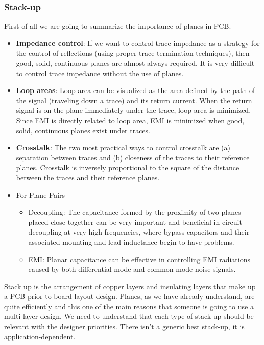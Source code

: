 \documentclass[final]{cubedoc}
\begin{document}
	\subsubsection{Stack-up}
	First of all we are going to summarize the importance of planes in PCB.
	\begin{itemize}
		\item \textbf{Impedance control}: If we want to control trace impedance as a strategy for the control of reflections (using proper trace termination techniques), then good, solid, continuous planes are almost always required. It is very difficult to control trace impedance without the use of planes.
		\item \textbf{Loop areas}: Loop area can be visualized as the area defined by the path of the signal (traveling down a trace) and its return current. When the return signal is on the plane immediately under the trace, loop area is minimized. Since EMI is directly related to loop area, EMI is minimized when good, solid, continuous planes exist under traces.
		\item \textbf{Crosstalk}: The two most practical ways to control crosstalk are (a) separation between traces and (b) closeness of the traces to their reference planes. Crosstalk is inversely proportional to the square of the distance between the traces and their reference planes.
		\item For Plane Pairs
		\begin{itemize}
			\item Decoupling: The capacitance formed by the proximity of two planes placed close together can be very important and beneficial in circuit decoupling at very high frequencies, where bypass capacitors and their associated mounting and lead inductance begin to have problems.
			\item EMI: Planar capacitance can be effective in controlling EMI radiations caused by both differential mode and common mode noise signals.
		\end{itemize}{}
	\end{itemize}
	
	
	Stack up is the arrangement of copper layers and insulating layers that make up a PCB prior to board layout design. Planes, as we have already understand, are quite efficiently and this one of the main reasons that someone is going to use a multi-layer design. We need to understand that each type of stack-up should be relevant with the designer priorities. There isn't a generic best stack-up, it is application-dependent. 
	
\end{document}
